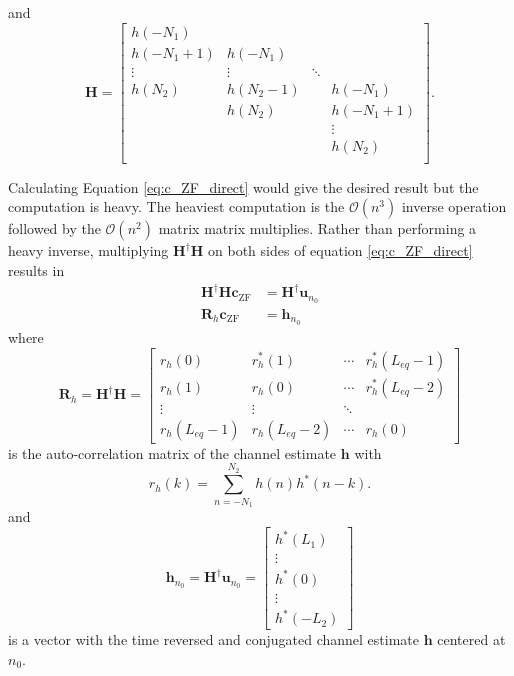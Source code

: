 and
\begin{equation} 
\mathbf{H} = 
		\begin{bmatrix}
		h(-N_1)		&  			& 		 	&  			\\
		h(-N_1+1) 	& h(-N_1)	& 		 	&  			\\
		\vdots	 	& \vdots	& \ddots 	&  			\\
		h(N_2)		& h(N_2-1) 	&  			& h(-N_1)  	\\
		 			& h(N_2) 	&  			& h(-N_1+1) \\
		 			&  	   		&  			& \vdots	\\
		 			&  	   		&  			& h(N_2)	\\
	\end{bmatrix}.
\end{equation}

Calculating Equation \eqref{eq:c_ZF_direct} would give the desired result but the computation is heavy.
The heaviest computation is the $\mathcal{O}(n^3)$ inverse operation followed by the $\mathcal{O}(n^2)$ matrix matrix multiplies.
Rather than performing a heavy inverse, multiplying $\mathbf{H}^\dagger \mathbf{H}$ on both sides of equation \eqref{eq:c_ZF_direct} results in
\begin{align}
\mathbf{H}^\dagger\mathbf{H} \mathbf{c}_\text{ZF} &= \mathbf{H}^\dagger \mathbf{u}_{n_0} \nonumber \\
\mathbf{R}_{h} \mathbf{c}_\text{ZF} &= \mathbf{h}_{n_0}
\label{eq:c_ZF_solve}
\end{align}
where
\begin{equation}
\mathbf{R}_{h} = 
\mathbf{H}^\dagger \mathbf{H} = 
		\begin{bmatrix}
		r_{h}(0)		& r^\ast_{h}(1)	& \cdots 	& r^\ast_{h}(L_{eq}-1)  	\\
		r_{h}(1) 		& r_{h}(0)		& \cdots 	& r^\ast_{h}(L_{eq}-2)  	\\
		\vdots	 			& \vdots				& \ddots 	&  							\\
		r_{h}(L_{eq}-1)	& r_{h}(L_{eq}-2)	& \cdots	& r_{h}(0)  			
	\end{bmatrix}
	\label{eq:R_h}
\end{equation}
is the auto-correlation matrix of the channel estimate $\mathbf{h}$ with 
\begin{equation}
r_{h}(k) = \sum_{n=-N_1}^{N_2} h(n) h^\ast(n-k).
\end{equation}
and 
\begin{equation}
\mathbf{h}_{n_0} = \mathbf{H}^\dagger \mathbf{u}_{n_0} = 
\begin{bmatrix} h^\ast(L_1) \\ \vdots \\ h^\ast(0) \\ \vdots \\ h^\ast(-L_2)  \end{bmatrix}
\label{eq:h_no}
\end{equation}
is a vector with the time reversed and conjugated channel estimate $\mathbf{h}$ centered at $n_0$.

